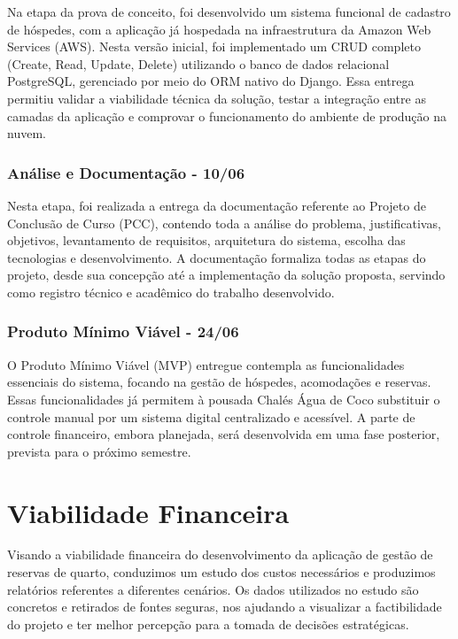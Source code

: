 \documentclass[
	12pt,				%
	openany,			%
	twoside,			%
	a4paper,			%
	english,			%
	french,				%
	spanish,			%
	brazil				%
	]{abntex2}
\begin{document}
Na etapa da prova de conceito, foi desenvolvido um sistema funcional de cadastro de hóspedes, com a aplicação já hospedada na infraestrutura da Amazon Web Services (AWS). Nesta versão inicial, foi implementado um CRUD completo (Create, Read, Update, Delete) utilizando o banco de dados relacional PostgreSQL, gerenciado por meio do ORM nativo do Django. Essa entrega permitiu validar a viabilidade técnica da solução, testar a integração entre as camadas da aplicação e comprovar o funcionamento do ambiente de produção na nuvem.

\subsection{Análise e Documentação - 10/06}

Nesta etapa, foi realizada a entrega da documentação referente ao Projeto de Conclusão de Curso (PCC), contendo toda a análise do problema, justificativas, objetivos, levantamento de requisitos, arquitetura do sistema, escolha das tecnologias e desenvolvimento. A documentação formaliza todas as etapas do projeto, desde sua concepção até a implementação da solução proposta, servindo como registro técnico e acadêmico do trabalho desenvolvido.

\subsection{Produto Mínimo Viável - 24/06}

O Produto Mínimo Viável (MVP) entregue contempla as funcionalidades essenciais do sistema, focando na gestão de hóspedes, acomodações e reservas. Essas funcionalidades já permitem à pousada Chalés Água de Coco substituir o controle manual por um sistema digital centralizado e acessível. A parte de controle financeiro, embora planejada, será desenvolvida em uma fase posterior, prevista para o próximo semestre.


\chapter{Viabilidade Financeira}
Visando a viabilidade financeira do desenvolvimento da aplicação de gestão de reservas de quarto, conduzimos um estudo dos custos necessários e produzimos relatórios referentes a diferentes cenários. Os dados utilizados no estudo são concretos e retirados de fontes seguras, nos ajudando a visualizar a factibilidade do projeto e ter melhor percepção para a tomada de decisões estratégicas.
\end{document}
